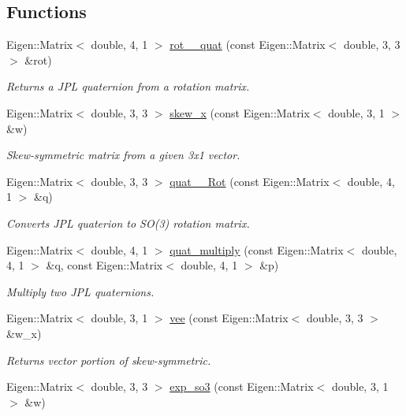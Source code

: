 \subsection*{Functions}
\begin{DoxyCompactItemize}
\item 
Eigen\+::\+Matrix$<$ double, 4, 1 $>$ \hyperlink{namespaceov__core_a1d2aafa6a756bb70fcd9f52695b4e573}{rot\+\_\+\_\+quat} (const Eigen\+::\+Matrix$<$ double, 3, 3 $>$ \&rot)
\begin{DoxyCompactList}\small\item\em Returns a J\+PL quaternion from a rotation matrix. \end{DoxyCompactList}\item 
Eigen\+::\+Matrix$<$ double, 3, 3 $>$ \hyperlink{namespaceov__core_a24012c54df35621a935655b2e230169d}{skew\+\_\+x} (const Eigen\+::\+Matrix$<$ double, 3, 1 $>$ \&w)
\begin{DoxyCompactList}\small\item\em Skew-\/symmetric matrix from a given 3x1 vector. \end{DoxyCompactList}\item 
Eigen\+::\+Matrix$<$ double, 3, 3 $>$ \hyperlink{namespaceov__core_adfb06397034cc6b346efb9517ed3757e}{quat\+\_\+\_\+\+Rot} (const Eigen\+::\+Matrix$<$ double, 4, 1 $>$ \&q)
\begin{DoxyCompactList}\small\item\em Converts J\+PL quaterion to S\+O(3) rotation matrix. \end{DoxyCompactList}\item 
Eigen\+::\+Matrix$<$ double, 4, 1 $>$ \hyperlink{namespaceov__core_aa708e95617ccac1c880451014f2715fa}{quat\+\_\+multiply} (const Eigen\+::\+Matrix$<$ double, 4, 1 $>$ \&q, const Eigen\+::\+Matrix$<$ double, 4, 1 $>$ \&p)
\begin{DoxyCompactList}\small\item\em Multiply two J\+PL quaternions. \end{DoxyCompactList}\item 
Eigen\+::\+Matrix$<$ double, 3, 1 $>$ \hyperlink{namespaceov__core_aaf2593d3bde63e31ac9fc20e345271dc}{vee} (const Eigen\+::\+Matrix$<$ double, 3, 3 $>$ \&w\+\_\+x)
\begin{DoxyCompactList}\small\item\em Returns vector portion of skew-\/symmetric. \end{DoxyCompactList}\item 
Eigen\+::\+Matrix$<$ double, 3, 3 $>$ \hyperlink{namespaceov__core_a835a207e29f0e50ddbf66d8ddce47514}{exp\+\_\+so3} (const Eigen\+::\+Matrix$<$ double, 3, 1 $>$ \&w)

\end{DoxyCompactItemize}
